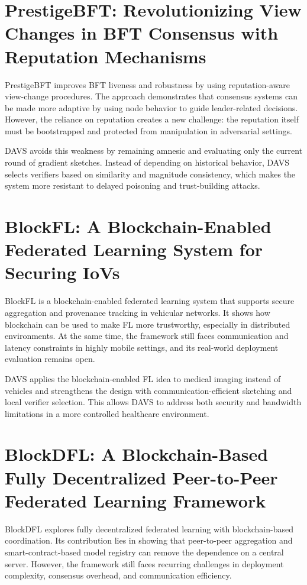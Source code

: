 \begingroup
\linespread{0.8}\selectfont
\section{PrestigeBFT: Revolutionizing View Changes in BFT Consensus with Reputation Mechanisms}
\endgroup
PrestigeBFT improves BFT liveness and robustness by using reputation-aware view-change procedures. The approach demonstrates that consensus systems can be made more adaptive by using node behavior to guide leader-related decisions. However, the reliance on reputation creates a new challenge: the reputation itself must be bootstrapped and protected from manipulation in adversarial settings.

DAVS avoids this weakness by remaining amnesic and evaluating only the current round of gradient sketches. Instead of depending on historical behavior, DAVS selects verifiers based on similarity and magnitude consistency, which makes the system more resistant to delayed poisoning and trust-building attacks.

\begingroup
\linespread{0.8}\selectfont
\section{BlockFL: A Blockchain-Enabled Federated Learning System for Securing IoVs}
\endgroup
BlockFL is a blockchain-enabled federated learning system that supports secure aggregation and provenance tracking in vehicular networks. It shows how blockchain can be used to make FL more trustworthy, especially in distributed environments. At the same time, the framework still faces communication and latency constraints in highly mobile settings, and its real-world deployment evaluation remains open.

DAVS applies the blockchain-enabled FL idea to medical imaging instead of vehicles and strengthens the design with communication-efficient sketching and local verifier selection. This allows DAVS to address both security and bandwidth limitations in a more controlled healthcare environment.

\begingroup
\linespread{0.8}\selectfont
\section{BlockDFL: A Blockchain-Based Fully Decentralized Peer-to-Peer Federated Learning Framework}
\endgroup
BlockDFL explores fully decentralized federated learning with blockchain-based coordination. Its contribution lies in showing that peer-to-peer aggregation and smart-contract-based model registry can remove the dependence on a central server. However, the framework still faces recurring challenges in deployment complexity, consensus overhead, and communication efficiency.

